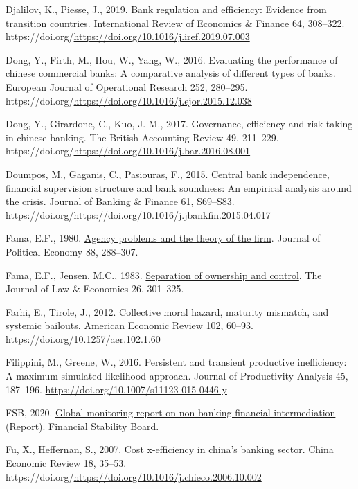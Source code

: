 \documentclass[
  12pt,
  a4paper,
]{scrreprt}
\newlength{\cslhangindent}
\newenvironment{CSLReferences}[2] %
 {\begin{list}{}{%
  \setlength{\itemindent}{0pt}
  \setlength{\leftmargin}{0pt}
  \setlength{\parsep}{0pt}
  \ifodd #1
   \setlength{\leftmargin}{\cslhangindent}
   \setlength{\itemindent}{-1\cslhangindent}
  \fi
  \setlength{\itemsep}{#2\baselineskip}}}
 {\end{list}}
\begin{document}
{{{{\begin{CSLReferences}{1}{0}
Djalilov, K., Piesse, J., 2019. Bank regulation and efficiency: Evidence
from transition countries. International Review of Economics \& Finance
64, 308--322.
https://doi.org/\url{https://doi.org/10.1016/j.iref.2019.07.003}

Dong, Y., Firth, M., Hou, W., Yang, W., 2016. Evaluating the performance
of chinese commercial banks: A comparative analysis of different types
of banks. European Journal of Operational Research 252, 280--295.
https://doi.org/\url{https://doi.org/10.1016/j.ejor.2015.12.038}

Dong, Y., Girardone, C., Kuo, J.-M., 2017. Governance, efficiency and
risk taking in chinese banking. The British Accounting Review 49,
211--229.
https://doi.org/\url{https://doi.org/10.1016/j.bar.2016.08.001}

Doumpos, M., Gaganis, C., Pasiouras, F., 2015. Central bank
independence, financial supervision structure and bank soundness: An
empirical analysis around the crisis. Journal of Banking \& Finance 61,
S69--S83.
https://doi.org/\url{https://doi.org/10.1016/j.jbankfin.2015.04.017}

Fama, E.F., 1980. \href{http://www.jstor.org/stable/1837292}{Agency
problems and the theory of the firm}. Journal of Political Economy 88,
288--307.

Fama, E.F., Jensen, M.C., 1983.
\href{http://www.jstor.org/stable/725104}{Separation of ownership and
control}. The Journal of Law \& Economics 26, 301--325.

Farhi, E., Tirole, J., 2012. Collective moral hazard, maturity mismatch,
and systemic bailouts. American Economic Review 102, 60--93.
\url{https://doi.org/10.1257/aer.102.1.60}

Filippini, M., Greene, W., 2016. Persistent and transient productive
inefficiency: A maximum simulated likelihood approach. Journal of
Productivity Analysis 45, 187--196.
\url{https://doi.org/10.1007/s11123-015-0446-y}

FSB, 2020.
\href{https://www.fsb.org/wp-content/uploads/P161220.pdf}{Global
monitoring report on non-banking financial intermediation} (Report).
Financial Stability Board.

Fu, X., Heffernan, S., 2007. Cost x-efficiency in china's banking
sector. China Economic Review 18, 35--53.
https://doi.org/\url{https://doi.org/10.1016/j.chieco.2006.10.002}


\end{CSLReferences}}}}}
\end{document}
